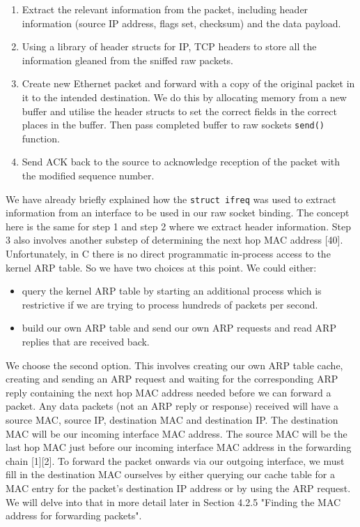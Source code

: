 \documentclass{uathesis}
\begin{document}
\begin{enumerate}
\item Extract the relevant information from the packet, including header information (source IP address, flags set, checksum) and the data payload. \\
\item Using a library of header structs for IP, TCP  headers to store all the information gleaned from the sniffed raw packets. \\
\item Create new Ethernet packet and forward with a copy of the original packet in it to the intended destination. We do this by allocating memory from a new buffer and utilise the header structs to set the correct fields in the correct places in the buffer. Then pass completed buffer to raw sockets {\tt send()} function.\\
\item Send ACK back to the source to acknowledge reception of the packet with the modified sequence number. \\
\end{enumerate}

We have already briefly explained how the {\tt struct ifreq} was used to extract information from an interface to be used in our raw socket binding. The concept here is the same for step 1 and step 2 where we extract header information. Step 3 also involves another substep of determining the next hop MAC address [40]. Unfortunately, in C there is no direct programmatic in-process access to the kernel ARP table. So we have two choices at this point. We could either:\\

\begin{itemize}
\item query the kernel ARP table by starting an additional process which is restrictive if we are trying to process hundreds of packets per second. 
\item build our own ARP table and send our own ARP requests and read ARP replies that are received back.\\
\end{itemize}

We choose the second option. This involves creating our own ARP table cache, creating and sending an ARP request and waiting for the corresponding ARP reply containing the next hop MAC address needed before we can forward a packet. Any data packets (not an ARP reply or response) received will have a source MAC, source IP, destination MAC and destination IP. The destination MAC will be our incoming interface MAC address. The source MAC will be the last hop MAC just before our incoming interface MAC address in the forwarding chain [1][2]. To forward the packet onwards via our outgoing interface, we must fill in the destination MAC ourselves by either querying our cache table for a MAC entry for the packet's destination IP address or by using the ARP request. We will delve into that in more detail later in Section 4.2.5 "Finding the MAC address for forwarding packets". \\
\end{document}
